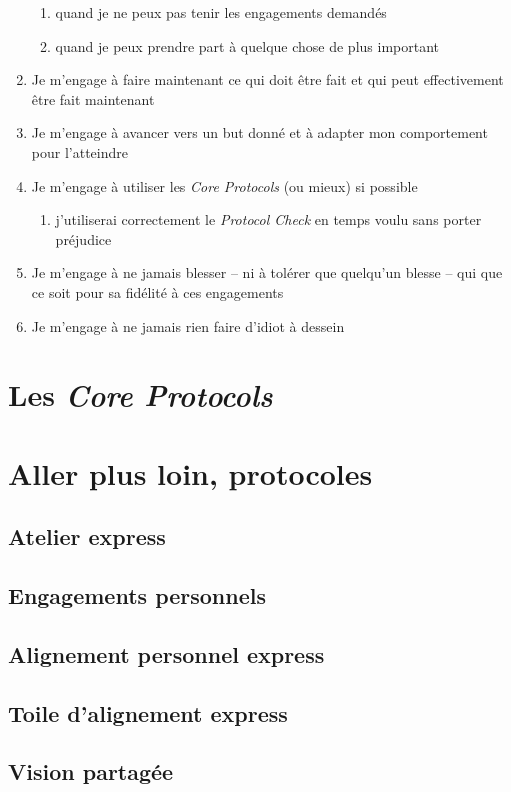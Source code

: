 \documentclass{book}
\begin{document}
\begin{enumerate}
\begin{enumerate}
		\item quand je ne peux pas tenir les engagements demandés
		\item quand je peux prendre part à quelque chose de plus important
	\end{enumerate}
	\item Je m'engage à faire maintenant ce qui doit être fait et qui peut effectivement être fait maintenant
	\item Je m'engage à avancer vers un but donné et à adapter mon comportement pour l'atteindre
	\item Je m'engage à utiliser les \emph{Core Protocols} (ou mieux) si possible
	\begin{enumerate}
		\item j'utiliserai correctement le \emph{Protocol Check} en temps voulu sans porter préjudice
	\end{enumerate}
	\item Je m'engage à ne jamais blesser -- ni à tolérer que quelqu'un blesse -- qui que ce soit pour sa fidélité à ces engagements
	\item Je m'engage à ne jamais rien faire d'idiot à dessein
\end{enumerate}

\chapter{Les \emph{Core Protocols}} \label{core-protocols}

\chapter{Aller plus loin, protocoles} \label{aller-plus-loin}

\section{Atelier express} \label{atelier-express}
\section{Engagements personnels} \label{engagements-personnels}
\section{Alignement personnel express} \label{alignement-personnel-express}
\section{Toile d'alignement express} \label{toile-alignement-express}
\section{Vision partagée} \label{vision-partagee}
\end{document}
